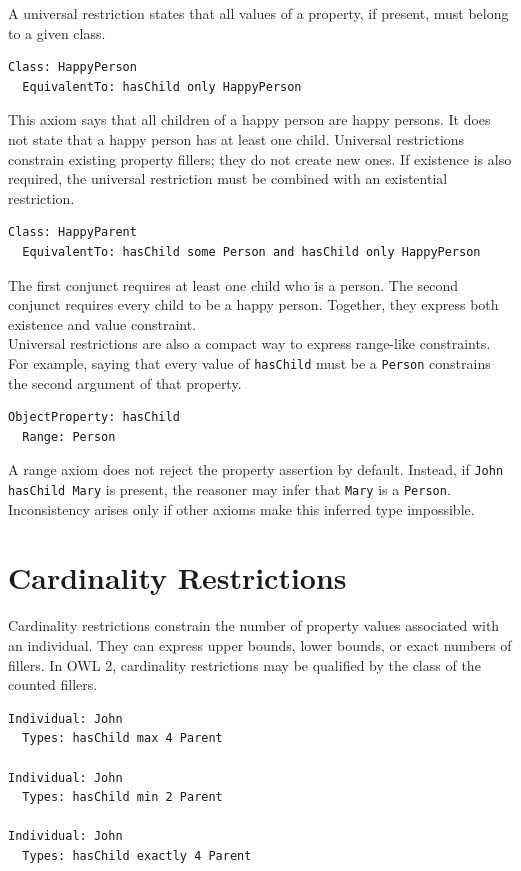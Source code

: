 \documentclass{scrbook}
\begin{document}
	A universal restriction states that all values of a property, if present, must belong to a given class.
	
	\begin{lstlisting}
Class: HappyPerson
  EquivalentTo: hasChild only HappyPerson
	\end{lstlisting}
	
	This axiom says that all children of a happy person are happy persons. It does not state that a happy person has at least one child. Universal restrictions constrain existing property fillers; they do not create new ones. If existence is also required, the universal restriction must be combined with an existential restriction.
	
	\begin{lstlisting}
Class: HappyParent
  EquivalentTo: hasChild some Person and hasChild only HappyPerson
	\end{lstlisting}
	
	The first conjunct requires at least one child who is a person. The second conjunct requires every child to be a happy person. Together, they express both existence and value constraint.\\
	
	Universal restrictions are also a compact way to express range-like constraints. For example, saying that every value of \texttt{hasChild} must be a \texttt{Person} constrains the second argument of that property.
	
	\begin{lstlisting}
ObjectProperty: hasChild
  Range: Person
	\end{lstlisting}
	
	A range axiom does not reject the property assertion by default. Instead, if \texttt{John hasChild Mary} is present, the reasoner may infer that \texttt{Mary} is a \texttt{Person}. Inconsistency arises only if other axioms make this inferred type impossible.
	
	\section{Cardinality Restrictions}
	
	Cardinality restrictions constrain the number of property values associated with an individual. They can express upper bounds, lower bounds, or exact numbers of fillers. In OWL 2, cardinality restrictions may be qualified by the class of the counted fillers.
	
	\begin{lstlisting}
Individual: John
  Types: hasChild max 4 Parent

Individual: John
  Types: hasChild min 2 Parent

Individual: John
  Types: hasChild exactly 4 Parent
	\end{lstlisting}
	
\end{document}
